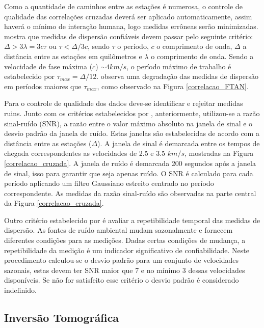 Como a quantidade de caminhos entre as estações é numerosa, o controle de qualidade das correlações cruzadas deverá ser aplicado automaticamente, assim haverá o mínimo de interação humana, logo medidas errôneas serão minimizadas. \cite{bensen_processing_2007} mostra que medidas de dispersão confiáveis devem passar pelo seguinte critério: $\Delta > 3\lambda = 3c\tau$ ou $\tau < \Delta/3c$, sendo $\tau$ o período, $c$ o comprimento de onda, $\Delta$ a distância entre as estações em quilômetros e $\lambda$ o comprimento de onda. Sendo a velocidade de fase máxima ($c$) $\sim 4 km/s$, o período máximo de trabalho é estabelecido por $\tau_{max} = \Delta/12$. \cite{bensen_processing_2007} observa uma degradação das medidas de dispersão em períodos maiores que $\tau_{max}$, como observado na Figura \ref{correlacao_FTAN}. 

Para o controle de qualidade dos dados deve-se identificar e rejeitar medidas ruins. Junto com os critérios estabelecidos por \cite{bensen_processing_2007}, anteriormente, utilizou-se a razão sinal-ruído (SNR), a razão entre o valor máximo absoluto na janela de sinal e o desvio padrão da janela de ruído. Estas janelas são estabelecidas de acordo com a distância entre as estações ($\Delta$). A janela de sinal é demarcada entre os tempos de chegada correspondentes as velocidades de 2.5 e 3.5 $km/s$, mostradas na Figura \ref{correlacao_cruzada}. A janela de ruído é demarcada 200 segundos após a janela de sinal, isso para garantir que seja apenas ruído. O SNR é calculado para cada período aplicando um filtro Gaussiano estreito centrado no período correspondente. As medidas da razão sinal-ruído são observadas na parte central da Figura \ref{correlacao_cruzada}. 

Outro critério estabelecido por \cite{bensen_processing_2007} é avaliar a repetibilidade temporal das medidas de dispersão. As fontes de ruído ambiental mudam sazonalmente e fornecem diferentes condições para as medições. Dadas certas condições de mudança, a repetibilidade da medição é um indicador significativo de confiabilidade. Neste procedimento calculou-se o desvio padrão para um conjunto de velocidades sazonais, estas devem ter SNR maior que 7 e no mínimo 3 dessas velocidades disponíveis. Se não for satisfeito esse critério o desvio padrão é considerado indefinido.

\subsection{Inversão Tomográfica}

